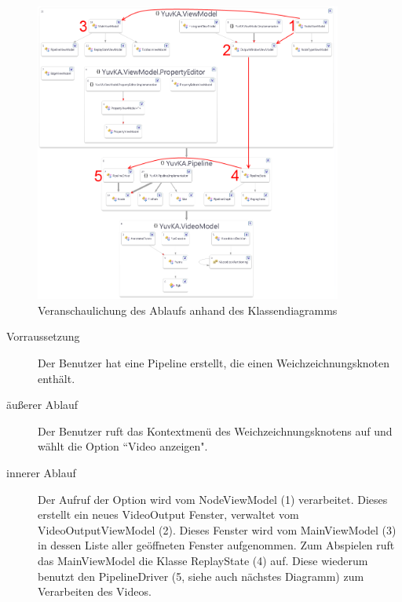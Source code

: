 \begin{figure}[h!]
\begin{center}
\includegraphics[width=0.9\textwidth]{Diagrams/visualization_TC2.png}
\end{center}
\caption{Veranschaulichung des Ablaufs anhand des Klassendiagramms}
\end{figure}
\begin{description}
	\item[Vorraussetzung] Der Benutzer hat eine Pipeline erstellt, die einen Weichzeichnungsknoten enthält.
	\item[äußerer Ablauf] Der Benutzer ruft das Kontextmenü des Weichzeichnungsknotens auf und wählt die Option ``Video anzeigen".
	\item[innerer Ablauf] Der Aufruf der Option wird vom NodeViewModel (1) verarbeitet. Dieses erstellt ein neues VideoOutput Fenster, verwaltet vom VideoOutputViewModel (2). Dieses Fenster wird vom MainViewModel (3) in dessen Liste aller geöffneten Fenster aufgenommen. Zum Abspielen ruft das MainViewModel die Klasse ReplayState (4) auf. Diese wiederum benutzt den PipelineDriver (5, siehe auch nächstes Diagramm) zum Verarbeiten des Videos.
\end{description}
\newpage
